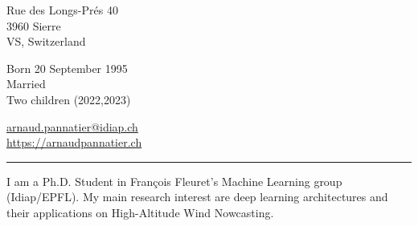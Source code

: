 \documentclass{article}
\begin{document}
\begin{minipage}[t]{0.25\textwidth}
  \vspace{0pt}

\end{minipage}\hfill
\begin{minipage}[t]{0.6\textwidth}
  \vspace{0pt}
  \centering
  \vspace{4mm}

  \begin{minipage}{0.4\textwidth}
    \small \normalfont
    Rue des Longs-Prés 40 \\
    3960 Sierre \\
    VS, Switzerland \\
  \end{minipage}
  \hfill
  \begin{minipage}{0.4\textwidth}
    \small \normalfont
    Born 20 September 1995 \\
    Married \\
    Two children (2022,2023) \\
  \end{minipage}\hfill

  \small \normalfont
  \href{mailto:arnaud.pannatier@idiap.ch}{arnaud.pannatier@idiap.ch}\\
  \href{https://arnaudpannatier.ch}{https://arnaudpannatier.ch}\\
\end{minipage}

\vspace{4mm}
\hrule
\vspace{1cm}
I am a Ph.D. Student in François Fleuret's Machine Learning group (Idiap/EPFL). My main research interest are deep learning architectures and their applications on High-Altitude Wind Nowcasting. \\
\end{document}
